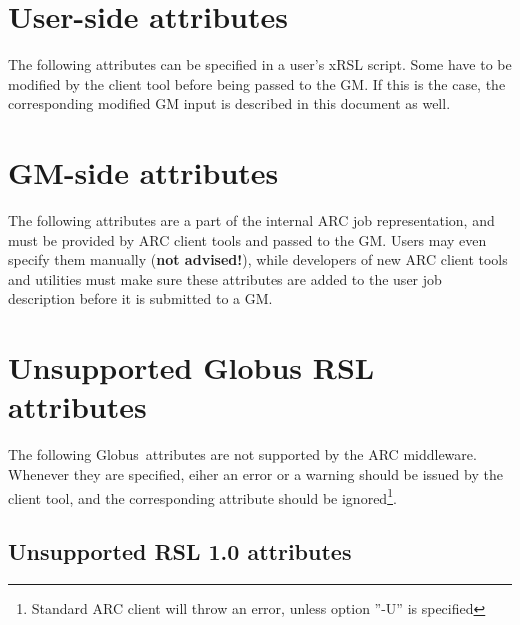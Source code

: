 \documentclass{book}
\newcommand{\globus}{Globus\textsuperscript{\textregistered}}
\begin{document}
  \section{User-side attributes}
  \label{sec:user}

  The following attributes  can be
  specified in a user's xRSL script. Some have to be modified by the client tool
  before being passed to the GM. If this is the case, the corresponding modified GM input is described in this document as well.

  

  \section{GM-side attributes}
  \label{sec:gm}

  The following attributes are a part of the internal ARC job representation, and must be provided by ARC client tools and passed to
  the GM. Users may even specify them manually (\textbf{not
  advised!}), while developers of new ARC client tools and utilities must make sure these attributes are added to the user job description before it is submitted to a GM.

  

  \section{Unsupported Globus RSL attributes}
  \label{sec:globus}

  The following \globus\ attributes are not supported by the ARC
  middleware. Whenever they are specified, eiher an error or a warning should be issued by the
  client tool, and the corresponding attribute should be ignored\footnote{Standard ARC client will throw an error, unless option ''-U'' is specified}.

  \subsection{Unsupported RSL 1.0 attributes}
\end{document}
